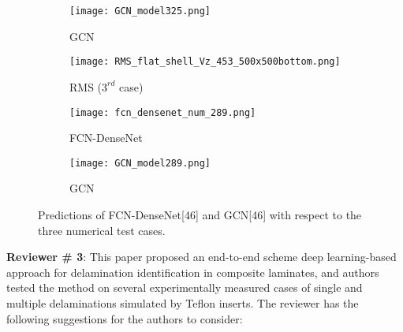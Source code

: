 \documentclass[11pt,a2paper]{report}
\begin{document}
\begin{enumerate}
\begin{figure}[ht!]
		\hfill
		\begin{subfigure}[b]{0.32\textwidth}
			\centering
			\texttt{[image: GCN\_model325.png]}
			\caption{GCN}
			\label{fig:AE_binary_RMS_462}
		\end{subfigure}
		\par\medskip
		\begin{subfigure}[b]{0.32\textwidth}
			\centering
			\texttt{[image: RMS\_flat\_shell\_Vz\_453\_500x500bottom.png]}
			\caption{RMS (\(3^{rd}\) case)}
			\label{fig:num_GT_453}
		\end{subfigure}
		\hfill	
		\begin{subfigure}[b]{0.32\textwidth}
			\centering
			\texttt{[image: fcn\_densenet\_num\_289.png]}
			\caption{FCN-DenseNet}
			\label{fig:Convlstm_binary_RMS_453}
		\end{subfigure}
		\hfill
		\begin{subfigure}[b]{0.32\textwidth}
			\centering
			\texttt{[image: GCN\_model289.png]}
			\caption{GCN}
			\label{fig:AE_binary_RMS_453}
		\end{subfigure}
		\caption{Predictions of FCN-DenseNet[46] and GCN[46] with respect to the three numerical test cases.}
		\label{fig:RMS_num_cases}
	\end{figure}


\end{enumerate}	

\newpage 
\textbf{Reviewer \# 3}:
\newline This paper proposed an end-to-end scheme deep learning-based approach 
for delamination identification in composite laminates, and authors tested the 
method on several experimentally measured cases of single and multiple 
delaminations simulated by Teﬂon inserts.
The reviewer has the following suggestions for the authors to consider:
\end{document}
